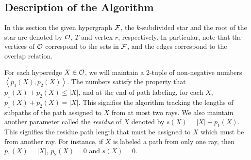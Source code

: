 \documentclass[11pt,
               envcountsect,
               envcountsame]
               {../lib/llncs2e/llncs}
\def\cF{{\cal F}}
\def\cO{{\cal O}}
\newcommand{\seq}[1]{\left\langle #1 \right\rangle}
\begin{document}
\subsection{Description of the Algorithm}
In this section the given hypergraph $\cF$, the $k$-subdivided star
and the root of the star are denoted by $\cO$, $T$ and vertex $r$,
respectively.  In particular, note that the vertices of $\cO$
correspond to the sets in $\cF$, and the edges correspond to the
overlap relation.

\noindent
For each hyperedge $X \in \cO$, we will maintain a 2-tuple of non-negative
 numbers $\seq{p_1(X), p_2(X)}$.  The numbers satisfy the property that
 $p_1(X) + p_2(X) \leq |X|$, and at the end of path labeling, for each
 $X$, $p_1(X) + p_2(X) = |X|$.  This signifies the algorithm tracking
 the lengths of subpaths of the path assigned to $X$ from at most two
 rays. We also maintain another parameter called the {\em residue} of
 $X$ denoted by $s(X)=|X| - p_1(X)$. This signifies the residue path
 length that must be assigned to $X$ which must be from another
 ray. For instance, if $X$ is labeled a path from only one ray, then
 $p_1(X) = |X|$, $p_2(X) = 0$ and $s(X) = 0$.
\end{document}
